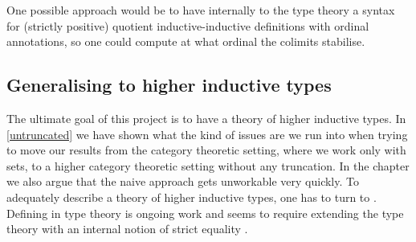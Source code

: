 One possible approach would be to have internally to the type theory a
syntax for (strictly positive) quotient inductive-inductive
definitions with ordinal annotations, so one could compute at what
ordinal the colimits stabilise.

\subsection{Generalising to higher inductive types}

The ultimate goal of this project is to have a theory of higher
inductive types. In \cref{untruncated} we have shown what the kind of
issues are we run into when trying to move our results from the
category theoretic setting, where we work only with sets, to a higher
category theoretic setting without any truncation. In the chapter we
also argue that the naive approach gets unworkable very quickly. To
adequately describe a theory of higher inductive types, one has to
turn to \inftycats. Defining \inftycats in type theory is ongoing work
and seems to require extending the type theory with an internal notion
of strict equality \cite{Altenkirch2016,Altenkirch2016iii}.
